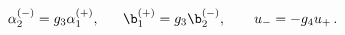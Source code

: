 \begin{equation}
  \alpha^{(-)}_2=g_3 \alpha^{(+)}_1,\ \ \ \ \
  \b^{(+)}_1=g_3\b^{(-)}_2, \ \ \ \ \ \ u_-=-g_4 u_+ \,.
  \end{equation}

